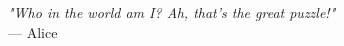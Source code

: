
\begin{flushright}
\emph{"Who in the world am I? Ah, that’s the great puzzle!"} \\
— Alice 
\end{flushright}